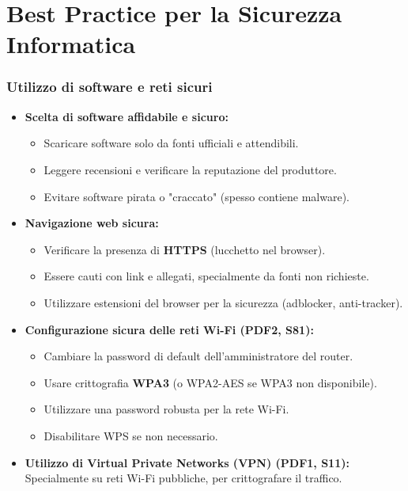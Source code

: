 \documentclass{beamer}
\begin{document}
\section{Best Practice per la Sicurezza Informatica}

\begin{frame}
  \frametitle{Utilizzo di software e reti sicuri}
  \begin{itemize}
    \item \textbf{Scelta di software affidabile e sicuro:}
    \begin{itemize}
        \item Scaricare software solo da fonti ufficiali e attendibili.
        \item Leggere recensioni e verificare la reputazione del produttore.
        \item Evitare software pirata o "craccato" (spesso contiene malware).
    \end{itemize}
    \item \textbf{Navigazione web sicura:}
    \begin{itemize}
        \item Verificare la presenza di \textbf{HTTPS} (lucchetto nel browser).
        \item Essere cauti con link e allegati, specialmente da fonti non richieste.
        \item Utilizzare estensioni del browser per la sicurezza (adblocker, anti-tracker).
    \end{itemize}
    \item \textbf{Configurazione sicura delle reti Wi-Fi (PDF2, S81):}
    \begin{itemize}
        \item Cambiare la password di default dell'amministratore del router.
        \item Usare crittografia \textbf{WPA3} (o WPA2-AES se WPA3 non disponibile).
        \item Utilizzare una password robusta per la rete Wi-Fi.
        \item Disabilitare WPS se non necessario.
    \end{itemize}
    \item \textbf{Utilizzo di Virtual Private Networks (VPN) (PDF1, S11):} Specialmente su reti Wi-Fi pubbliche, per crittografare il traffico.
  \end{itemize}
\end{frame}
\end{document}
